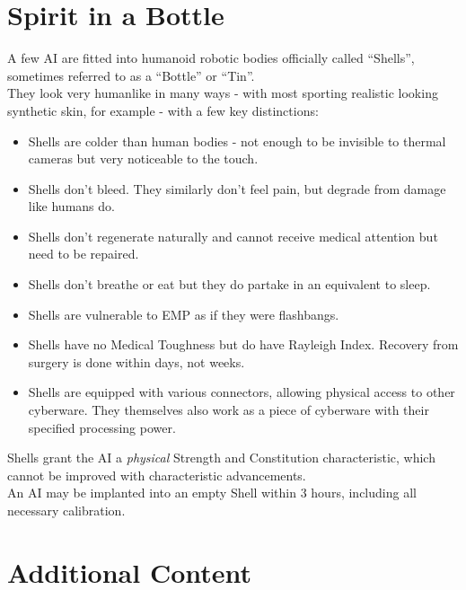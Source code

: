 \documentclass[12pt,a4paper,openany,usenames,dvipsnames]{book}
\begin{document}
	\chapter{Spirit in a Bottle}
	A few AI are fitted into humanoid robotic bodies officially called “Shells”, sometimes referred to as a “Bottle” or “Tin”.
	\\%
	They look very humanlike in many ways - with most sporting realistic looking synthetic skin, for example - with a few key distinctions:
	\vspace{-8mm}
	\begin{itemize}
		\setlength\itemsep{-8mm}
		\item Shells are colder than human bodies - not enough to be invisible to thermal cameras but very noticeable to the touch.
		\item Shells don’t bleed.
			They similarly don't feel pain,
				but degrade from damage like humans do.
		\item Shells don’t regenerate naturally and cannot receive medical attention but need to be repaired.
		\item Shells don’t breathe or eat but they do partake in an equivalent to sleep.
		\item Shells are vulnerable to EMP as if they were flashbangs.
		\item Shells have no Medical Toughness but do have Rayleigh Index. Recovery from surgery is done within days, not weeks.
		\item Shells are equipped with various connectors, allowing physical access to other cyberware. They themselves also work as a piece of cyberware with their specified processing power.
	\end{itemize}
	\par
	Shells grant the AI a \emph{physical} Strength and Constitution characteristic, which cannot be improved with characteristic advancements.
	\\%
	An AI may be implanted into an empty Shell within 3 hours, including all necessary calibration.

	\chapter{Additional Content}
	\vspace{-18mm}
\end{document}
